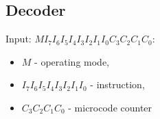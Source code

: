 \documentclass[a4paper]{article}
\begin{document}
\subsection{Decoder}
Input: \texttt{$MI_7I_6I_5I_4I_3I_2I_1I_0C_3C_2C_1C_0$}:
\begin{itemize}
    \item \texttt{$M$} - operating mode, 
    \item \texttt{$I_7I_6I_5I_4I_3I_2I_1I_0$} - instruction, 
    \item \texttt{$C_3C_2C_1C_0$} - microcode counter
\end{itemize}

\pagebreak

%
\end{document}

